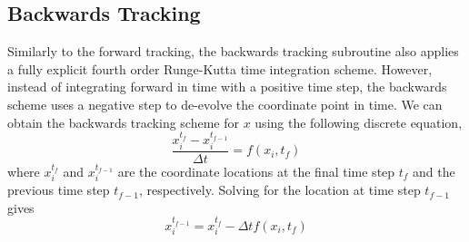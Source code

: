 \subsection{Backwards Tracking} 
Similarly to the forward tracking, the backwards tracking subroutine also
applies a fully explicit fourth order Runge-Kutta time integration scheme.
However, instead of integrating forward in time with a positive time step,
the backwards scheme uses a negative step to de-evolve the coordinate point
in time. We can obtain the backwards tracking scheme for $x$ using the
following discrete equation,
\begin{equation}
    \frac{x^{t_{f}}_{i}-x^{t_{f-1}}_{i}}{\Delta t} =
        f\left(x_{i}, t_{f}\right)
\end{equation}
where $x^{t_{f}}_{i}$ and $x^{t_{f-1}}_{i}$ are the coordinate locations at
the final time step $t_{f}$ and the previous time step $t_{f-1}$,
respectively. Solving for the location at time step $t_{f-1}$ gives 
\begin{equation}
    x^{t_{f-1}}_{i} = x^{t_{f}}_{i} - \Delta t f\left(x_{i}, t_{f}\right) 
\end{equation}
